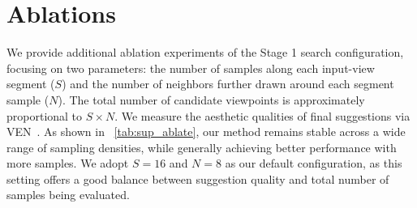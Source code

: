 \section{Ablations}
We provide additional ablation experiments of the Stage 1 search configuration, focusing on two parameters: the number of samples along each input-view segment ($S$) and the number of neighbors further drawn around each segment sample ($N$). The total number of candidate viewpoints is approximately proportional to $S\times N$. We measure the aesthetic qualities of final suggestions via VEN~\cite{wei2018good}. As shown in ~\cref{tab:sup_ablate}, our method remains stable across a wide range of sampling densities, while generally achieving better performance with more samples. We adopt $S=16$ and $N=8$ as our default configuration, as this setting offers a good balance between suggestion quality and total number of samples being evaluated.

% 
